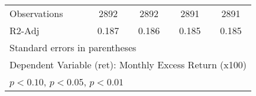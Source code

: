 \begin{table}[htbp]
\begin{tabular}{l*{4}{c}}
Observations        &        2892         &        2892         &        2891         &        2891         \\
R2-Adj              &       0.187         &       0.186         &       0.185         &       0.185         \\
\hline\hline
\multicolumn{5}{l}{\footnotesize Standard errors in parentheses}\\
\multicolumn{5}{l}{\footnotesize Dependent Variable (ret): Monthly Excess Return (x100)}\\
\multicolumn{5}{l}{\footnotesize \sym{*} \(p<0.10\), \sym{**} \(p<0.05\), \sym{***} \(p<0.01\)}\\
\end{tabular}
\end{table}
